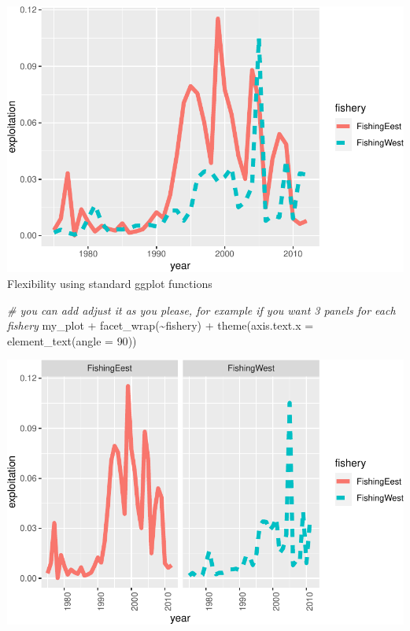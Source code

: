 \documentclass[
]{book}
\newenvironment{Shaded}{\begin{snugshade}}{\end{snugshade}}
\newcommand{\AttributeTok}[1]{\textcolor[rgb]{0.77,0.63,0.00}{#1}}
\newcommand{\CommentTok}[1]{\textcolor[rgb]{0.56,0.35,0.01}{\textit{#1}}}
\newcommand{\DecValTok}[1]{\textcolor[rgb]{0.00,0.00,0.81}{#1}}
\newcommand{\FunctionTok}[1]{\textcolor[rgb]{0.00,0.00,0.00}{#1}}
\newcommand{\NormalTok}[1]{#1}
\newcommand{\SpecialCharTok}[1]{\textcolor[rgb]{0.00,0.00,0.00}{#1}}
\begin{document}
\includegraphics{_main_files/figure-latex/pressures-1.pdf}
Flexibility using standard ggplot functions

\begin{Shaded}
\begin{Highlighting}[]
\CommentTok{\# you can add adjust it as you please, for example if you want 3 panels for each fishery}
\NormalTok{my\_plot }\SpecialCharTok{+} 
  \FunctionTok{facet\_wrap}\NormalTok{(}\SpecialCharTok{\textasciitilde{}}\NormalTok{fishery) }\SpecialCharTok{+} 
  \FunctionTok{theme}\NormalTok{(}\AttributeTok{axis.text.x =} \FunctionTok{element\_text}\NormalTok{(}\AttributeTok{angle =} \DecValTok{90}\NormalTok{))}
\end{Highlighting}
\end{Shaded}

\includegraphics{_main_files/figure-latex/pressures_alt-1.pdf}
\end{document}
